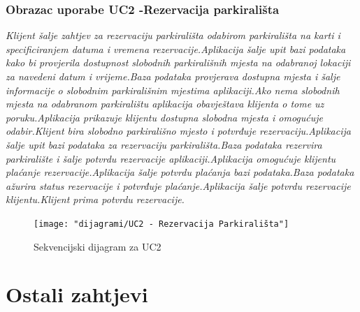 \subsubsection{Obrazac uporabe UC2 -Rezervacija parkirališta}

\textit{Klijent šalje zahtjev za rezervaciju parkirališta odabirom parkirališta na karti i specificiranjem datuma i vremena rezervacije.Aplikacija šalje upit bazi podataka kako bi provjerila dostupnost slobodnih parkirališnih mjesta na odabranoj lokaciji za navedeni datum i vrijeme.Baza podataka provjerava dostupna mjesta i šalje informacije o slobodnim parkirališnim mjestima aplikaciji.Ako nema slobodnih mjesta na odabranom parkiralištu aplikacija obavještava klijenta o tome uz poruku.Aplikacija prikazuje klijentu dostupna slobodna mjesta i omogućuje odabir.Klijent bira slobodno parkirališno mjesto i potvrđuje rezervaciju.Aplikacija šalje upit bazi podataka za rezervaciju parkirališta.Baza podataka rezervira parkiralište i šalje potvrdu rezervacije aplikaciji.Aplikacija omogućuje klijentu plaćanje rezervacije.Aplikacija šalje potvrdu plaćanja bazi podataka.Baza podataka ažurira status rezervacije i potvrđuje plaćanje.Aplikacija šalje potvrdu rezervacije klijentu.Klijent prima potvrdu rezervacije.}


\begin{figure}
	\centering
	\texttt{[image: "dijagrami/UC2 - Rezervacija Parkirališta"]}
	\caption{Sekvencijski dijagram za UC2}
	\label{fig:uc2---rezervacija-parkiralista}
\end{figure}

\newpage

\section{Ostali zahtjevi}
	\begin{packed_item}
		\item {}
		\item {}
		\item {}
		\item {}
		\item {}
		\item {}
		\item {}
		\item {}
	\end{packed_item}



\eject

	
